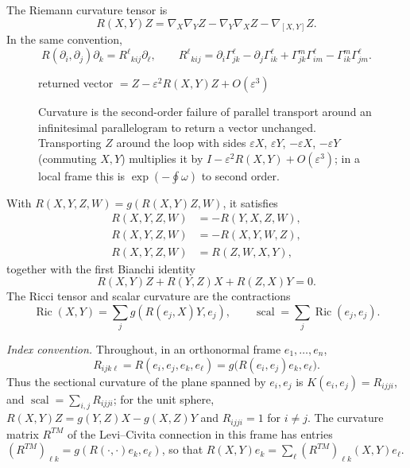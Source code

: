 \documentclass[11pt,oneside,reqno]{book}
\theoremstyle{plain}
\theoremstyle{definition}
\theoremstyle{remark}
\begin{document}
The Riemann curvature tensor is
\[
 R(X,Y)Z
 =
 \nabla_X\nabla_YZ-\nabla_Y\nabla_XZ-\nabla_{[X,Y]}Z.
\]
In the same convention,
\[
 R(\partial_i,\partial_j)\partial_k
 =R^\ell{}_{kij}\partial_\ell,
 \qquad
 R^\ell{}_{kij}
 =\partial_i\Gamma^\ell_{jk}-\partial_j\Gamma^\ell_{ik}
  +\Gamma^m_{jk}\Gamma^\ell_{im}
  -\Gamma^m_{ik}\Gamma^\ell_{jm}.
\]

\begin{figure}[htbp]
\centering
{}

\smallskip
{\color{red!40!black}returned vector
\(=Z-\varepsilon^2R(X,Y)Z+O(\varepsilon^3)\)}
\caption[Curvature as infinitesimal holonomy]{Curvature is the second-order failure of parallel transport
around an infinitesimal parallelogram to return a vector unchanged.
Transporting \(Z\) around the loop with sides \(\varepsilon X\),
\(\varepsilon Y\), \(-\varepsilon X\), \(-\varepsilon Y\) (commuting
\(X,Y\)) multiplies it by \(I-\varepsilon^2R(X,Y)+O(\varepsilon^3)\); in a
local frame this is \(\exp(-\oint\omega)\) to second order.}
\label{fig:holonomy}
\end{figure}

With \(R(X,Y,Z,W)=g(R(X,Y)Z,W)\), it satisfies
\[
\begin{aligned}
 R(X,Y,Z,W)&=-R(Y,X,Z,W),\\
 R(X,Y,Z,W)&=-R(X,Y,W,Z),\\
 R(X,Y,Z,W)&=R(Z,W,X,Y),
\end{aligned}
\]
together with the first Bianchi identity
\[
 R(X,Y)Z+R(Y,Z)X+R(Z,X)Y=0.
\]
The Ricci tensor and scalar curvature are the contractions
\[
 \operatorname{Ric}(X,Y)=\sum_j g(R(e_j,X)Y,e_j),
 \qquad
 \operatorname{scal}=\sum_j\operatorname{Ric}(e_j,e_j).
\]

\emph{Index convention.}  Throughout, in an orthonormal frame
\(e_1,\ldots,e_n\),
\begin{equation}\label{eq:Rijkl}
 R_{ijk\ell}=R(e_i,e_j,e_k,e_\ell)=g\bigl(R(e_i,e_j)e_k,e_\ell\bigr).
\end{equation}
Thus the sectional curvature of the plane spanned by \(e_i,e_j\) is
\(K(e_i,e_j)=R_{ijji}\), and \(\operatorname{scal}=\sum_{i,j}R_{ijji}\);
for the unit sphere, \(R(X,Y)Z=g(Y,Z)X-g(X,Z)Y\) and \(R_{ijji}=1\) for
\(i\ne j\).  The curvature matrix \(R^{TM}\) of the Levi--Civita connection
in this frame has entries
\((R^{TM})_{\ell k}=g(R(\cdot,\cdot)e_k,e_\ell)\), so that
\(R(X,Y)e_k=\sum_\ell(R^{TM})_{\ell k}(X,Y)e_\ell\).
\end{document}
